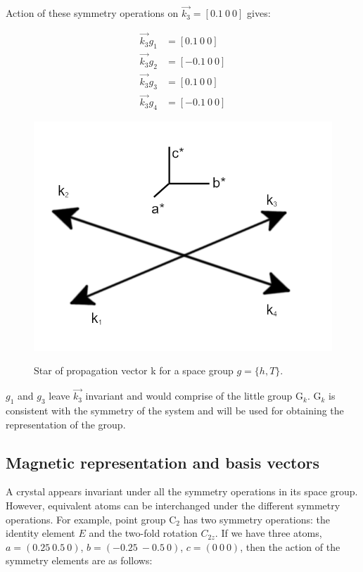 \documentclass[letterpaper,10pt,doublespacing,edeposit]{uiucthesis2020}
\begin{document}
\begin{mainmatter}
Action of these symmetry operations on $\vec{k_3} = [0.1\ 0\ 0]$ gives:

\begin{align*}
\vec{k_3}g_1 &= [0.1\ 0\ 0]\\
\vec{k_3}g_2 &= [-0.1\ 0\ 0]\\
\vec{k_3}g_3 &= [0.1\ 0\ 0]\\
\vec{k_3}g_4 &= [-0.1\ 0\ 0]
\end{align*}

\begin{figure}
\centering\includegraphics[width=0.5\columnwidth]{figures/ch4/k-star.png} \\
\caption{\label{fig:star}
Star of propagation vector k for a space group $g = \{h,T\}$.
}
\end{figure}

$g_1$ and $g_3$ leave $\vec{k_3}$ invariant and would comprise of the little group G$_k$. G$_k$ is consistent with the symmetry of the system and will be used for obtaining the representation of the group.

\subsection{Magnetic representation and basis vectors}


A crystal appears invariant under all the symmetry operations in its space group. However, equivalent atoms can be interchanged under the different symmetry operations. For example, point group C$_2$ has two symmetry operations: the identity element $E$ and the two-fold rotation $C_{2z}$. If we have three atoms, $a = (0.25\ 0.5\ 0)$, $b = (-0.25\ -0.5\ 0)$, $c = (0\ 0\ 0)$, then the action of the symmetry elements are as follows:


\end{mainmatter}
\end{document}
